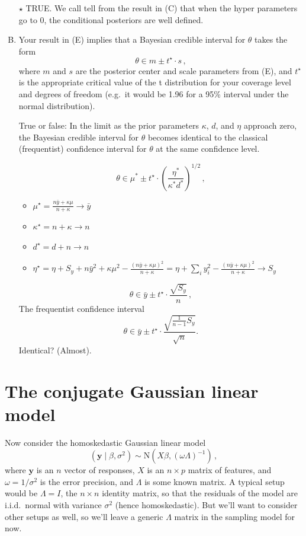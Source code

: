 \documentclass[11pt]{article}
\newcommand{\by}{\textbf{y}}
\newcommand{\jie}{$\star$ }
\newcommand{\N}{\mbox{N}}
\begin{document}
\begin{enumerate}[(A)]
\bigskip
\jie TRUE. We call tell from the result in (C) that when the hyper parameters go to 0, the conditional posteriors are well defined.

\item Your result in (E) implies that a Bayesian credible interval for $\theta$ takes the form
$$
\theta \in m \pm t^{\star} \cdot s \, ,
$$
where $m$ and $s$ are the posterior center and scale parameters from (E), and $t^\star$ is the appropriate critical value of the t distribution for your coverage level and degrees of freedom (e.g.~it would be 1.96 for a 95\% interval under the normal distribution).

True or false: In the limit as the prior parameters $\kappa$, $d$, and $\eta$ approach zero, the Bayesian credible interval for $\theta$ becomes identical to the classical (frequentist) confidence interval for $\theta$ at the same confidence level.

$$
\theta \in \mu^* \pm t^{\star} \cdot (\frac{\eta^*}{\kappa^* d^*})^{1/2} \, ,
$$

\begin{itemize}
\item $\mu^\star =  \frac{n\bar{y} + \kappa \mu}{n+\kappa} \rightarrow \bar{y}$
\item $\kappa^\star = n + \kappa \rightarrow n $
\item $d^{\star} =  d+n \rightarrow n$
\item $\eta^\star = \eta + S_y +n\bar{y}^2 + \kappa \mu^2 - \frac{(n\bar{y} + \kappa \mu)^2}{n+\kappa} = \eta +\sum_i y_i^2 - \frac{(n\bar{y} + \kappa \mu)^2}{n+\kappa} \rightarrow S_y$
\end{itemize}

$$
\theta \in \bar{y} \pm t^{\star} \cdot \frac{\sqrt{S_y}}{n} \, ,
$$
The frequentist confidence interval
$$\theta \in \bar{y} \pm t^{\star} \cdot \frac{\sqrt{\frac{1}{n-1}S_y}}{\sqrt{n}}.$$
Identical? (Almost).

\end{enumerate}


\newpage 

\section{The conjugate Gaussian linear model}

Now consider the homoskedastic Gaussian linear model
$$
(\by \mid \beta, \sigma^2) \sim \N(X\beta, (\omega \Lambda)^{-1} ) \, ,
$$
where $\by$ is an $n$ vector of responses, $X$ is an $n \times p$ matrix of features, and $\omega = 1/\sigma^2$ is the error precision, and $\Lambda$ is some known matrix.  A typical setup would be $\Lambda = I$, the $n \times n$ identity matrix, so that the residuals of the model are i.i.d.~normal with variance $\sigma^2$ (hence homoskedastic).  But we'll want to consider other setups as well, so we'll leave a generic $\Lambda$ matrix in the sampling model for now.
\end{document}
